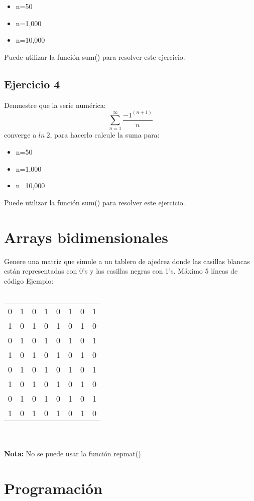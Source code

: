 \documentclass{article}
\begin{document}
\begin{itemize}
	\item n=50
	\item n=1,000
	\item n=10,000
\end{itemize}
Puede utilizar la función sum() para resolver este ejercicio.	
\subsection{Ejercicio 4}

Demuestre que la serie numérica:
\[
\sum_{n=1}^{\infty}\frac{-1^{(n+1)}}{n}
\]
converge a $ ln\ 2 $, para hacerlo calcule la suma para:

\begin{itemize}
	\item n=50
	\item n=1,000
	\item n=10,000
\end{itemize}
Puede utilizar la función sum() para resolver este ejercicio.	
\section{Arrays bidimensionales}
	
	Genere una matriz que simule a un tablero de ajedrez donde las casillas blancas están representadas con 0's y las casillas negras con 1's. Máximo 5 líneas de código Ejemplo:\\\\
	\begin{tabular}{cccccccc}
	0 &    1  &   0   &  1 &    0  &   1 &    0 &    1\\
	1 &    0 &    1  &   0   &  1 &    0 &    1 &    0\\
	0 &    1 &    0   &  1 &    0     &1&     0&     1\\
	1 &    0 &    1  &   0 &    1  &   0   &  1 &    0\\
	0  &   1 &    0  &   1  &   0  &   1  &   0 &    1\\
	1 &    0 &    1 &    0  &   1   &  0  &   1  &   0\\
	0    & 1&     0   &  1 &    0  &   1  &   0 &    1\\
	1  &   0  &   1&     0  &   1 &    0   &  1 &    0		
	\end{tabular}\\\\
\textbf{Nota:} No se puede usar la función repmat()
	
\section{Programación}
\end{document}
